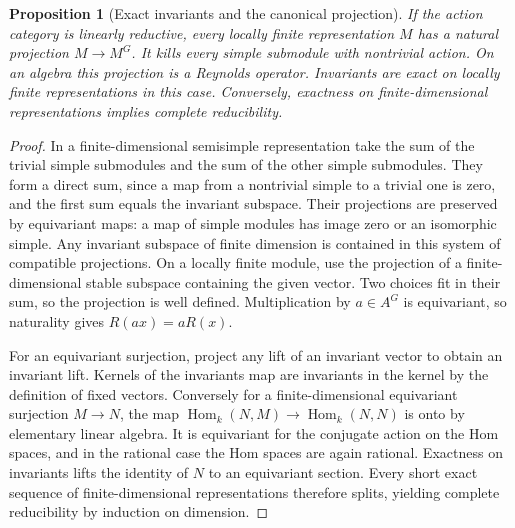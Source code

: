 \documentclass[11pt,oneside,openany]{book}
\newtheorem{proposition}[theorem]{Proposition}
\theoremstyle{definition}
\theoremstyle{remark}
\begin{document}
\begin{proposition}[Exact invariants and the canonical projection]
\label{res:IN02}
If the action category is linearly reductive, every locally finite
representation \(M\) has a natural projection \(M\to M^G\). It
kills every simple submodule with nontrivial action. On an algebra
this projection is a Reynolds operator. Invariants are exact on
locally finite representations in this case. Conversely, exactness
on finite-dimensional representations implies complete reducibility.
\end{proposition}
\begin{proof}
In a finite-dimensional semisimple representation take the sum of
the trivial simple submodules and the sum of the other simple
submodules. They form a direct sum, since a map from a nontrivial
simple to a trivial one is zero, and the first sum equals the
invariant subspace. Their projections are preserved by equivariant
maps: a map of simple modules has image zero or an isomorphic
simple. Any invariant subspace of finite dimension is contained
in this system of compatible projections. On a locally finite
module, use the projection of a finite-dimensional stable
subspace containing the given vector. Two choices fit in their
sum, so the projection is well defined. Multiplication by
\(a\in A^G\) is equivariant, so naturality gives \(R(ax)=aR(x)\).

For an equivariant surjection, project any lift of an invariant
vector to obtain an invariant lift. Kernels of the invariants
map are invariants in the kernel by the definition of fixed
vectors. Conversely for a finite-dimensional equivariant
surjection \(M\to N\), the map
\(\operatorname{Hom}_k(N,M)\to\operatorname{Hom}_k(N,N)\)
is onto by elementary linear algebra. It is equivariant for
the conjugate action on the Hom spaces, and in the rational
case the Hom spaces are again rational. Exactness on invariants
lifts the identity of \(N\) to an equivariant section. Every
short exact sequence of finite-dimensional representations
therefore splits, yielding complete reducibility by induction
on dimension.
\end{proof}
\end{document}
